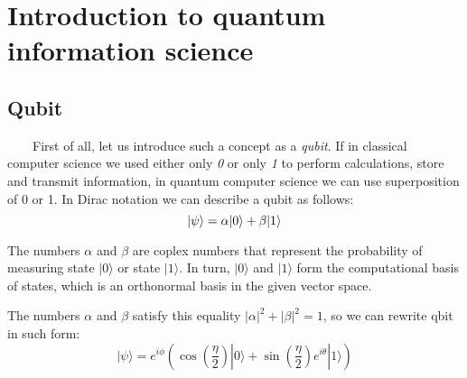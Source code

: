 \documentclass[english,14pt,a4paper]{article}
\begin{document}
	\tableofcontents
	\pagebreak
	\section{Introduction to quantum information science}
	\subsection{Qubit} \ \ \ \
	First of all, let us introduce such a concept as a \textit{qubit}. If in classical computer science we used either only \textit{0} or only \textit{1} to perform calculations, store and transmit information, in quantum computer science we can use superposition of 0 or 1. In Dirac notation we can describe a qubit as follows:
	\begin{equation}
		\ket{\psi}  = \alpha | 0 \rangle + \beta | 1 \rangle
	\end{equation}
	
	The numbers $\alpha$ and $\beta$ are coplex numbers that represent the probability of measuring state $| 0 \rangle $ or state $| 1 \rangle $. In turn, $| 0 \rangle $ and $| 1 \rangle $ form the computational basis of states, which is an orthonormal basis in the given vector space. 
	
	The numbers $\alpha$ and $\beta$ satisfy this equality $|\alpha|^2 + |\beta|^2 = 1$, so we can rewrite qbit in such form:
	\begin{equation}
		| \psi \rangle = e^{i\phi}( \cos(\frac{\eta}{2})| 0 \rangle + \sin(\frac{\eta}{2})e^{i\theta}| 1 \rangle)
	\end{equation} 
	 
\end{document}
